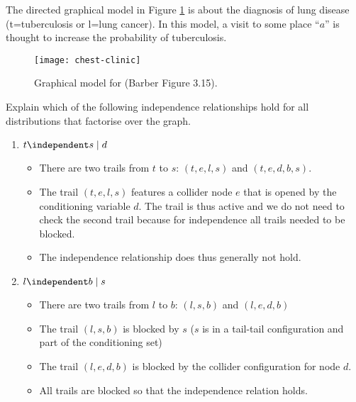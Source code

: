 

\label{ex:chest-clinic}
The directed graphical model in Figure \ref{fig:chest-clinic} is about
the diagnosis of lung disease (t=tuberculosis or l=lung cancer). In
this model, a visit to some place ``$a$'' is thought to increase the
probability of tuberculosis.

\begin{figure}[h!]
  \centering
  \texttt{[image: chest-clinic]}
  \caption{\label{fig:chest-clinic}Graphical model for  (Barber Figure 3.15).}
\end{figure}

\begin{exenumerate}
\item Explain which of the following independence relationships hold for all distributions that factorise over the graph.
  \begin{enumerate}
  \item $t \independent s \mid d$

    \begin{solution}
      \begin{itemize}
        \item There are two trails from $t$ to $s$: $(t,e,l,s)$ and $(t,e,d,b,s)$. 
        \item The trail $(t,e,l,s)$ features a collider node $e$ that is opened by the conditioning variable $d$. The trail is thus active and we do not need to check the second trail because for independence all trails needed to be blocked.
        \item The independence relationship does thus generally not hold.
      \end{itemize}
      
      \end{solution}
    
  \item $l \independent b \mid s$

\begin{solution}
  \begin{itemize}
  \item There are two trails from $l$ to $b$: $(l,s,b)$ and $(l,e,d,b)$
  \item The trail $(l,s,b)$ is blocked by $s$ ($s$ is in a tail-tail configuration and part of the conditioning set)
  \item The trail $(l,e,d,b)$ is blocked by the collider configuration for node $d$.
  \item  All trails are blocked so that the independence relation holds.
  \end{itemize}
\end{solution}


\end{enumerate}
\end{exenumerate}
